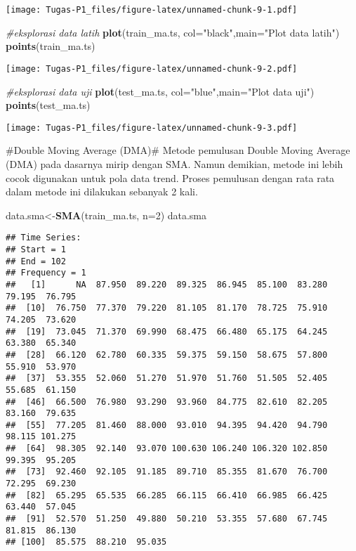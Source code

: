 \documentclass[
]{article}
\newenvironment{Shaded}{\begin{snugshade}}{\end{snugshade}}
\newcommand{\AttributeTok}[1]{\textcolor[rgb]{0.13,0.29,0.53}{#1}}
\newcommand{\CommentTok}[1]{\textcolor[rgb]{0.56,0.35,0.01}{\textit{#1}}}
\newcommand{\DecValTok}[1]{\textcolor[rgb]{0.00,0.00,0.81}{#1}}
\newcommand{\FunctionTok}[1]{\textcolor[rgb]{0.13,0.29,0.53}{\textbf{#1}}}
\newcommand{\NormalTok}[1]{#1}
\newcommand{\OtherTok}[1]{\textcolor[rgb]{0.56,0.35,0.01}{#1}}
\newcommand{\StringTok}[1]{\textcolor[rgb]{0.31,0.60,0.02}{#1}}
\begin{document}
\texttt{[image: Tugas-P1\_files/figure-latex/unnamed-chunk-9-1.pdf]}

\begin{Shaded}
\begin{Highlighting}[]
\CommentTok{\#eksplorasi data latih}
\FunctionTok{plot}\NormalTok{(train\_ma.ts, }\AttributeTok{col=}\StringTok{"black"}\NormalTok{,}\AttributeTok{main=}\StringTok{"Plot data latih"}\NormalTok{)}
\FunctionTok{points}\NormalTok{(train\_ma.ts)}
\end{Highlighting}
\end{Shaded}

\texttt{[image: Tugas-P1\_files/figure-latex/unnamed-chunk-9-2.pdf]}

\begin{Shaded}
\begin{Highlighting}[]
\CommentTok{\#eksplorasi data uji}
\FunctionTok{plot}\NormalTok{(test\_ma.ts, }\AttributeTok{col=}\StringTok{"blue"}\NormalTok{,}\AttributeTok{main=}\StringTok{"Plot data uji"}\NormalTok{)}
\FunctionTok{points}\NormalTok{(test\_ma.ts)}
\end{Highlighting}
\end{Shaded}

\texttt{[image: Tugas-P1\_files/figure-latex/unnamed-chunk-9-3.pdf]}

\#Double Moving Average (DMA)\# Metode pemulusan Double Moving Average
(DMA) pada dasarnya mirip dengan SMA. Namun demikian, metode ini lebih
cocok digunakan untuk pola data trend. Proses pemulusan dengan rata rata
dalam metode ini dilakukan sebanyak 2 kali.

\begin{Shaded}
\begin{Highlighting}[]
\NormalTok{data.sma}\OtherTok{\textless{}{-}}\FunctionTok{SMA}\NormalTok{(train\_ma.ts, }\AttributeTok{n=}\DecValTok{2}\NormalTok{)}
\NormalTok{data.sma}
\end{Highlighting}
\end{Shaded}

\begin{verbatim}
## Time Series:
## Start = 1 
## End = 102 
## Frequency = 1 
##   [1]      NA  87.950  89.220  89.325  86.945  85.100  83.280  79.195  76.795
##  [10]  76.750  77.370  79.220  81.105  81.170  78.725  75.910  74.205  73.620
##  [19]  73.045  71.370  69.990  68.475  66.480  65.175  64.245  63.380  65.340
##  [28]  66.120  62.780  60.335  59.375  59.150  58.675  57.800  55.910  53.970
##  [37]  53.355  52.060  51.270  51.970  51.760  51.505  52.405  55.685  61.150
##  [46]  66.500  76.980  93.290  93.960  84.775  82.610  82.205  83.160  79.635
##  [55]  77.205  81.460  88.000  93.010  94.395  94.420  94.790  98.115 101.275
##  [64]  98.305  92.140  93.070 100.630 106.240 106.320 102.850  99.395  95.205
##  [73]  92.460  92.105  91.185  89.710  85.355  81.670  76.700  72.295  69.230
##  [82]  65.295  65.535  66.285  66.115  66.410  66.985  66.425  63.440  57.045
##  [91]  52.570  51.250  49.880  50.210  53.355  57.680  67.745  81.815  86.130
## [100]  85.575  88.210  95.035
\end{verbatim}
\end{document}
